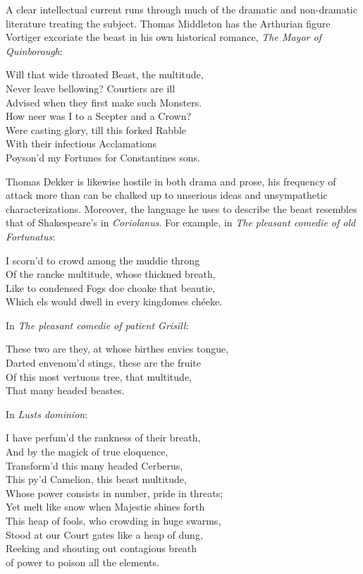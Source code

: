 A clear intellectual current runs through much of the dramatic and non-dramatic literature treating the subject.
Thomas Middleton has the Arthurian figure Vortiger excoriate the beast in his own historical romance, \emph{The Mayor of Quinborough}:
\begin{vq}
Will that wide throated Beast, the multitude,\\
Never leave bellowing? Courtiers are ill\\
Advised when they first make such Monsters.\\
How neer was I to a Scepter and a Crown?\\
Were casting glory, till this forked Rabble\\
With their infectious Acclamations\\
Poyson'd my Fortunes for Constantines sons.\\
\hfill\cite[5--6]{middleton_mayor_1661}
\end{vq}
Thomas Dekker is likewise hostile in both drama and prose, his frequency of attack more than can be chalked up to unserious ideas and unsympathetic characterizations.
Moreover, the language he uses to describe the beast resembles that of Shakespeare's in \emph{Coriolanus}.
For example, in \emph{The pleasant comedie of old Fortunatus}:
\begin{vq}
I scorn'd to crowd among the muddie throng\\
Of the rancke multitude, whose thickned breath,\\
Like to condensed Fogs doe choake that beautie,\\
Which els would dwell in every kingdomes chéeke.\\
\hfill\cite[sig. E1v]{dekker_pleasant_1600}
\end{vq}
In \emph{The pleasant comedie of patient Grisill}:
\begin{vq}
These two are they, at whose birthes envies tongue,\\
Darted envenom'd stings, these are the fruite\\
Of this most vertuous tree, that multitude,\\
That many headed beastes.\\
\hfill\cite[sig. L1r]{dekker_pleasant_1603}
\end{vq}
In \emph{Lusts dominion}:
\begin{vq}
I have perfum'd the rankness of their breath,\\
And by the magick of true eloquence,\\
Transform'd this many headed Cerberus,\\
This py'd Camelion, this beast multitude,\\
Whose power consists in number, pride in threats;\\
Yet melt like snow when Majestie shines forth\\
This heap of fools, who crowding in huge swarms,\\
Stood at our Court gates like a heap of dung,\\
Reeking and shouting out contagious breath\\
of power to poison all the elements.\\
\hfill\cite[sig. E3r]{dekker_lusts_1657}
\end{vq}
